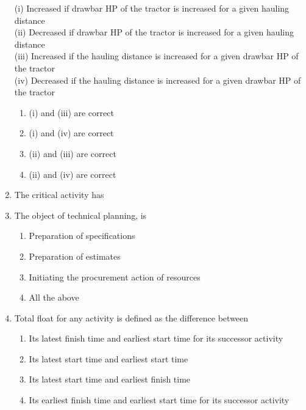 \documentclass[11pt,a4paper]{article}
\begin{document}
\begin{enumerate}
{ (i) Increased if drawbar HP of the tractor is increased for a given hauling distance \\
 (ii) Decreased if drawbar HP of the tractor is increased for a given hauling distance \\
 (iii) Increased if the hauling distance is increased for a given drawbar HP of the tractor \\
 (iv) Decreased if the hauling distance is increased for a given drawbar HP of the tractor}
\begin{enumerate}[label=\Alph*.]
\item{(i) and (iii) are correct}
\item{(i) and (iv) are correct}
\item{(ii) and (iii) are correct}
\item{(ii) and (iv) are correct}
\end{enumerate}
\item{The critical activity has}
\\
\item{The object of technical planning, is}
\begin{enumerate}[label=\Alph*.]
\item{Preparation of specifications}
\item{Preparation of estimates}
\item{Initiating the procurement action of resources}
\item{All the above}
\end{enumerate}
\item{Total float for any activity is defined as the difference between}
\begin{enumerate}[label=\Alph*.]
\item{Its latest finish time and earliest start time for its successor activity}
\item{Its latest start time and earliest start time}
\item{Its latest start time and earliest finish time}
\item{Its earliest finish time and earliest start time for its successor activity}
\end{enumerate}
\end{enumerate}
\end{document}
